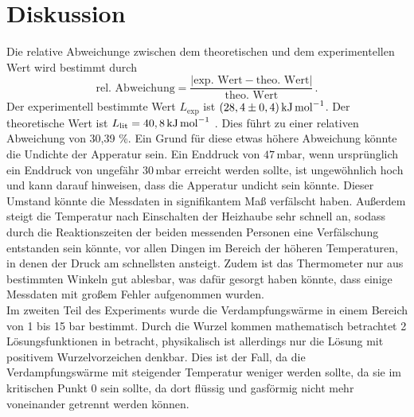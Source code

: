 \section{Diskussion}
\label{sec:Diskussion}
Die relative Abweichunge zwischen dem theoretischen und dem experimentellen Wert wird bestimmt durch
$$\text{rel. Abweichung} = \frac{|\text{exp. Wert} - \text{theo. Wert}|}{\text{theo. Wert}}\,.$$
Der experimentell bestimmte Wert $L_{\text{exp}}$ ist $(28,4 \pm 0,4) \, \unit[per-mode=reciprocal]{\kilo\joule\per\mol}$. Der theoretische Wert ist 
$L_{\text{lit}} = 40,8 \, \unit[per-mode=reciprocal]{\kilo\joule\per\mol}$ \cite{L_Literatur}.
Dies führt zu einer relativen Abweichung von 30,39 \%. 
Ein Grund für diese etwas höhere Abweichung könnte die Undichte der Apperatur sein. Ein Enddruck von $47 \,\unit{\milli\bar}$, wenn ursprünglich ein 
Enddruck von ungefähr $30 \,\unit{\milli\bar}$ erreicht werden sollte, ist ungewöhnlich hoch und kann darauf hinweisen, dass die Apperatur undicht sein könnte.
Dieser Umstand könnte die Messdaten in signifikantem Maß verfälscht haben. Außerdem steigt die Temperatur nach Einschalten der Heizhaube sehr schnell an, sodass
durch die Reaktionszeiten der beiden messenden Personen eine Verfälschung entstanden sein könnte, vor allen Dingen im Bereich der höheren Temperaturen, in 
denen der Druck am schnellsten ansteigt. Zudem ist das Thermometer nur aus bestimmten Winkeln gut ablesbar, 
was dafür gesorgt haben könnte, dass einige Messdaten mit großem Fehler aufgenommen wurden. \\
Im zweiten Teil des Experiments wurde die Verdampfungswärme in einem Bereich von 1 bis 15 bar bestimmt. Durch die Wurzel kommen mathematisch betrachtet 2 Lösungsfunktionen
in betracht, physikalisch ist allerdings nur die Lösung mit positivem Wurzelvorzeichen denkbar. Dies ist der Fall, da die Verdampfungswärme mit steigender Temperatur 
weniger werden sollte, da sie im kritischen Punkt 0 sein sollte, da dort flüssig und gasförmig nicht mehr voneinander getrennt werden können.





